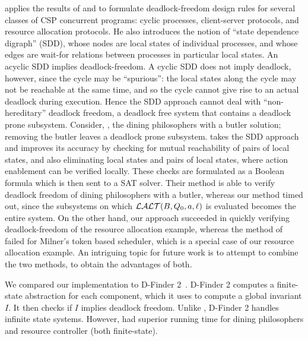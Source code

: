  applies the results of  and  to formulate deadlock-freedom design rules for several classes of CSP concurrent
programs: cyclic processes, client-server protocols, and resource allocation protocols. He also introduces the notion of ``state dependence digraph''
(SDD), whose nodes are local states of individual processes, and whose edges are wait-for relations between processes in particular local states. An
acyclic SDD implies deadlock-freedom. A cyclic SDD does not imply deadlock, however, since the cycle may be ``spurious'': the local states along the
cycle may not be reachable at the same time, and so the cycle cannot give rise to an actual deadlock during execution. Hence the SDD approach cannot
deal with ``non-hereditary'' deadlock freedom, \ie a deadlock free system that contains a deadlock prone subsystem. Consider, \eg, the dining
philosophers with a butler solution; removing the butler leaves a deadlock prone subsystem.
%
takes the SDD approach and improves its accuracy by checking for mutual reachability of pairs of local states, and also
eliminating local states and pairs of local states, where action enablement can be verified locally.
These checks are formulated as a Boolean formula which is then sent to
a SAT solver. Their method is able to verify deadlock freedom of
dining philosophers with a butler, whereas our method timed out, %
since the subsystems on which $\mathcal{LALT}(B, Q_0, a, \ell)$ is evaluated becomes the entire system.
On the other hand, our approach succeeded in quickly verifying deadlock-freedom of the resource
allocation example, whereas the method of 
failed for Milner's token based scheduler, which is a special
case of our resource allocation example.
%
An intriguing topic for future work is to attempt to combine the two methods, to obtain the
advantages of both.



We compared our implementation \deadlocktool to D-Finder 2~\cite{DFinder2}. 
D-Finder 2 computes a finite-state abstraction for each component, which it uses
to compute a global invariant $I$. It then checks if $I$ 
implies deadlock freedom.  Unlike \deadlocktool, D-Finder 2 
handles infinite state systems.
However, \deadlocktool had superior running time for
dining philosophers and resource controller (both finite-state).

